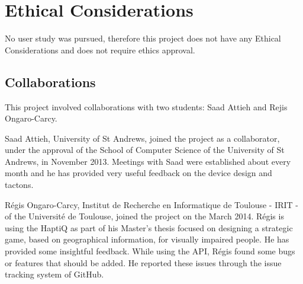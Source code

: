 \chapter{Ethical Considerations}

No user study was pursued, therefore this project does not have any Ethical Considerations and does not require ethics approval.\newline \par

\section{Collaborations}
\label{sec:collaborators}
This project involved collaborations with two students: Saad Attieh and Rejis Ongaro-Carcy.  

Saad Attieh, University of St Andrews, joined the project as a collaborator, under the approval of the School of Computer Science of the University of St Andrews, in November 2013. Meetings with Saad were established about every month and he has provided very useful feedback on the device design and tactons. 

Régis Ongaro-Carcy, Institut de Recherche en Informatique de Toulouse - IRIT - of the Université de Toulouse, joined the project on the  March 2014. Régis is using the HaptiQ as part of his Master's thesis focused on designing a strategic game, based on geographical information, for visually impaired people. He has provided some insightful feedback. While using the API, Régis found some bugs or features that should be added. He reported these issues through the issue tracking system of GitHub.